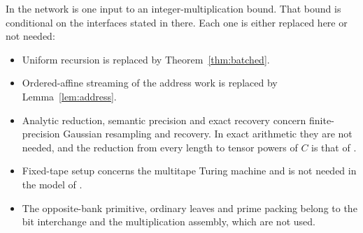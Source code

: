 \documentclass[11pt]{article}
\theoremstyle{definition}
\begin{document}
In \cite{cms} the network is one input to an integer-multiplication bound.
That bound is conditional on the interfaces stated in
 there. Each one is either replaced here or not
needed:
\begin{itemize}
\item Uniform recursion is replaced by Theorem~\ref{thm:batched}.
\item Ordered-affine streaming of the address work is replaced by
  Lemma~\ref{lem:address}.
\item Analytic reduction, semantic precision and exact recovery concern
  finite-precision Gaussian resampling and recovery. In exact arithmetic they
  are not needed, and the reduction from every length to tensor powers of $C$ is
  that of \cite[\S\S3--5]{oai-dft}.
\item Fixed-tape setup concerns the multitape Turing machine and is not needed
  in the model of \cite[\S1.1]{oai-dft}.
\item The opposite-bank primitive, ordinary leaves and prime packing belong to
  the bit interchange and the multiplication assembly, which are not used.
\end{itemize}
\end{document}
